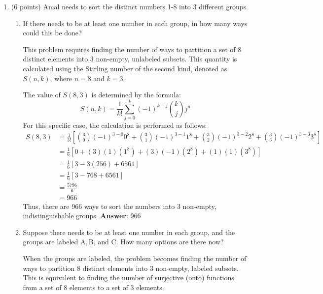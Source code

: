 \documentclass{article}
\begin{document}
\begin{enumerate}
  
  \item (6 points) Amal needs to sort the distinct numbers 1-8 into 3 different groups.
  \begin{enumerate}
    \item If there needs to be at least one number in each group, in how many ways could this be done?
    \begin{answer}
      This problem requires finding the number of ways to partition a set of 8 distinct elements into 3 non-empty, unlabeled subsets. This quantity is calculated using the Stirling number of the second kind, denoted as $S(n, k)$, where $n=8$ and $k=3$.

      The value of $S(8, 3)$ is determined by the formula:
      $$S(n, k) = \frac{1}{k!} \sum_{j=0}^{k} (-1)^{k-j} \binom{k}{j} j^n$$
      For this specific case, the calculation is performed as follows:
      \begin{align*}
        S(8, 3) &= \frac{1}{3!} \left[ \binom{3}{0}(-1)^{3-0} 0^8 + \binom{3}{1}(-1)^{3-1} 1^8 + \binom{3}{2}(-1)^{3-2} 2^8 + \binom{3}{3}(-1)^{3-3} 3^8 \right] \\
        &= \frac{1}{6} \left[ 0 + (3)(1)(1^8) + (3)(-1)(2^8) + (1)(1)(3^8) \right] \\
        &= \frac{1}{6} \left[ 3 - 3(256) + 6561 \right] \\
        &= \frac{1}{6} [3 - 768 + 6561] \\
        &= \frac{5796}{6} \\
        &= 966
      \end{align*}
      Thus, there are 966 ways to sort the numbers into 3 non-empty, indistinguishable groups.
      \newline\newline
      \textbf{Answer}: 966
    \end{answer}
    \item Suppose there needs to be at least one number in each group, and the groups are labeled $\mathrm{A}, \mathrm{B}$, and C. How many options are there now?
    \begin{answer}
      When the groups are labeled, the problem becomes finding the number of ways to partition 8 distinct elements into 3 non-empty, labeled subsets. This is equivalent to finding the number of surjective (onto) functions from a set of 8 elements to a set of 3 elements.


\end{answer}
\end{enumerate}
\end{enumerate}
\end{document}

